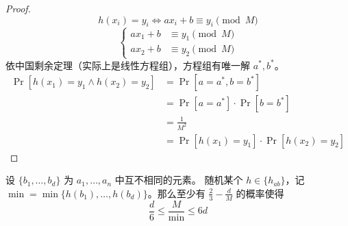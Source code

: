 \begin{proof}
    \[
        h(x_{i})=y_{i} \iff ax_{i}+b \equiv y_i \pmod M
    \]
    \[
        \left\{ \begin{aligned} ax_1 + b &\equiv y_1 \pmod M \\ ax_2 + b &\equiv y_2 \pmod M \end{aligned} \right.
    \]
    依中国剩余定理（实际上是线性方程组），方程组有唯一解 $a^*, b^*$。
    \begin{align*}
        \Pr[h(x_{1})=y_{1} \land h(x_{2})=y_{2}] &= \Pr[a=a^{*}, b=b^{*}] \\
        &= \Pr[a=a^{*}] \cdot \Pr[b=b^{*}] \\
        &= \frac{1}{M^{2}} \\
        &= \Pr[h(x_1)=y_1] \cdot \Pr[h(x_2)=y_2]
    \end{align*}
\end{proof}

\begin{theorem}
    设 $\{b_1, \dots, b_d\}$ 为 $a_1, \dots, a_n$ 中互不相同的元素。
    随机某个 $h\in\{h_{ab}\}$，记 $\min = \min\{h(b_1), \dots, h(b_d)\}$。那么至少有 $\frac{2}{3} - \frac{d}{M}$ 的概率使得
    \[
        \frac{d}{6} \le \frac{M}{\min} \le 6d
    \]
\end{theorem}

